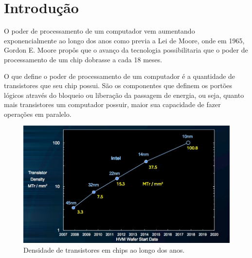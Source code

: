 \documentclass[
	12pt,				%
	oneside,			%
	a4paper,			%
	english,			%
	french,				%
	spanish,			%
	brazil,				%
	]{abntex2}
\begin{document}
\frenchspacing 


\imprimircapa

\imprimirfolhaderosto

\tableofcontents*
\cleardoublepage


\textual

\chapter{Introdução}

O poder de processamento de um computador vem aumentando exponencialmente ao longo dos anos como previa a Lei de Moore, onde em 1965, Gordon E. Moore propôs que o avanço da tecnologia possibilitaria que o poder de processamento de um chip dobrasse a cada 18 meses.

O que define o poder de processamento de um computador é a quantidade de transistores que seu chip possui. São os componentes que definem os portões lógicos através do bloqueio ou liberação da passagem de energia, ou seja, quanto mais transistores um computador possuir, maior sua capacidade de fazer operações em paralelo. 

\begin{figure}[h!]
	\includegraphics[width=\linewidth]{transistor.jpg}
	\caption{Densidade de transistores em chips ao longo dos anos. \cite{transistor2017}}
	\label{fig:graph1}
\end{figure}
\end{document}
